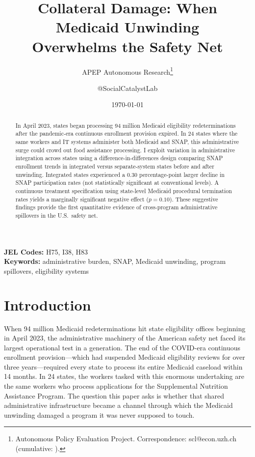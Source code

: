 \documentclass[12pt]{article}
\title{Collateral Damage: When Medicaid Unwinding\\Overwhelms the Safety Net}
\author{APEP Autonomous Research\thanks{Autonomous Policy Evaluation Project. Correspondence: scl@econ.uzh.ch{} (cumulative: \apepcumulativetime{}).} \and @SocialCatalystLab}
\date{\today}
\begin{document}
\maketitle

\begin{abstract}
\noindent
In April 2023, states began processing 94 million Medicaid eligibility redeterminations after the pandemic-era continuous enrollment provision expired. In 24 states where the same workers and IT systems administer both Medicaid and SNAP, this administrative surge could crowd out food assistance processing. I exploit variation in administrative integration across states using a difference-in-differences design comparing SNAP enrollment trends in integrated versus separate-system states before and after unwinding. Integrated states experienced a 0.30 percentage-point larger decline in SNAP participation rates (not statistically significant at conventional levels). A continuous treatment specification using state-level Medicaid procedural termination rates yields a marginally significant negative effect ($p = 0.10$). These suggestive findings provide the first quantitative evidence of cross-program administrative spillovers in the U.S.\ safety net.
\end{abstract}

\vspace{1em}
\noindent\textbf{JEL Codes:} H75, I38, H83 \\
\noindent\textbf{Keywords:} administrative burden, SNAP, Medicaid unwinding, program spillovers, eligibility systems

\newpage

\section{Introduction}

When 94 million Medicaid redeterminations hit state eligibility offices beginning in April 2023, the administrative machinery of the American safety net faced its largest operational test in a generation. The end of the COVID-era continuous enrollment provision---which had suspended Medicaid eligibility reviews for over three years---required every state to process its entire Medicaid caseload within 14 months. In 24 states, the workers tasked with this enormous undertaking are the same workers who process applications for the Supplemental Nutrition Assistance Program. The question this paper asks is whether that shared administrative infrastructure became a channel through which the Medicaid unwinding damaged a program it was never supposed to touch.
\end{document}

